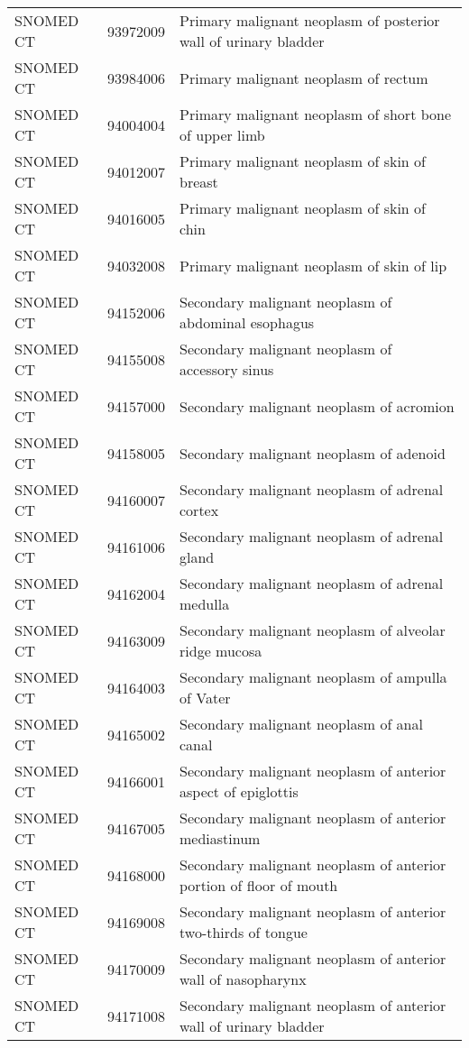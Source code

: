 \begin{longtable}{p{}p{}p{}}
  SNOMED CT & 93972009 & Primary malignant neoplasm of posterior wall of urinary bladder \\ 
  SNOMED CT & 93984006 & Primary malignant neoplasm of rectum \\ 
  SNOMED CT & 94004004 & Primary malignant neoplasm of short bone of upper limb \\ 
  SNOMED CT & 94012007 & Primary malignant neoplasm of skin of breast \\ 
  SNOMED CT & 94016005 & Primary malignant neoplasm of skin of chin \\ 
  SNOMED CT & 94032008 & Primary malignant neoplasm of skin of lip \\ 
  SNOMED CT & 94152006 & Secondary malignant neoplasm of abdominal esophagus \\ 
  SNOMED CT & 94155008 & Secondary malignant neoplasm of accessory sinus \\ 
  SNOMED CT & 94157000 & Secondary malignant neoplasm of acromion \\ 
  SNOMED CT & 94158005 & Secondary malignant neoplasm of adenoid \\ 
  SNOMED CT & 94160007 & Secondary malignant neoplasm of adrenal cortex \\ 
  SNOMED CT & 94161006 & Secondary malignant neoplasm of adrenal gland \\ 
  SNOMED CT & 94162004 & Secondary malignant neoplasm of adrenal medulla \\ 
  SNOMED CT & 94163009 & Secondary malignant neoplasm of alveolar ridge mucosa \\ 
  SNOMED CT & 94164003 & Secondary malignant neoplasm of ampulla of Vater \\ 
  SNOMED CT & 94165002 & Secondary malignant neoplasm of anal canal \\ 
  SNOMED CT & 94166001 & Secondary malignant neoplasm of anterior aspect of epiglottis \\ 
  SNOMED CT & 94167005 & Secondary malignant neoplasm of anterior mediastinum \\ 
  SNOMED CT & 94168000 & Secondary malignant neoplasm of anterior portion of floor of mouth \\ 
  SNOMED CT & 94169008 & Secondary malignant neoplasm of anterior two-thirds of tongue \\ 
  SNOMED CT & 94170009 & Secondary malignant neoplasm of anterior wall of nasopharynx \\ 
  SNOMED CT & 94171008 & Secondary malignant neoplasm of anterior wall of urinary bladder \\ 

\end{longtable}
